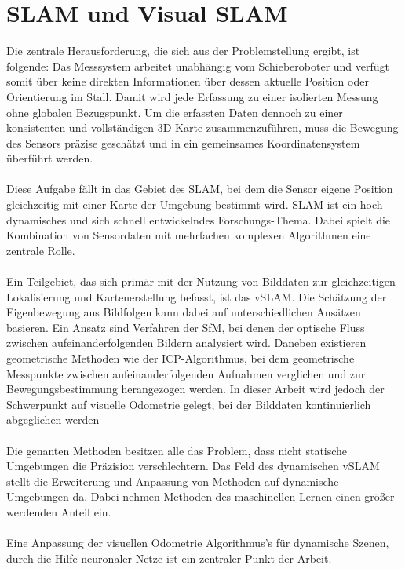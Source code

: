 \documentclass[12pt,DIV=15,BCOR=15mm,twoside,headsepline,abstract=true,listof=totoc,bibliography=totoc]{scrreprt}
\theoremstyle{remark}    %
\begin{document}
    \section{SLAM und Visual SLAM}
    Die zentrale Herausforderung, die sich aus der Problemstellung ergibt, ist folgende:
    Das Messsystem arbeitet unabhängig vom Schieberoboter und verfügt somit über keine direkten Informationen über dessen aktuelle Position oder 
    Orientierung im Stall. Damit wird jede Erfassung zu einer isolierten Messung ohne globalen Bezugspunkt.
    Um die erfassten Daten dennoch zu einer konsistenten und vollständigen 3D-Karte zusammenzuführen, muss die Bewegung des Sensors präzise geschätzt 
    und in ein gemeinsames Koordinatensystem überführt werden.\\\\
    Diese Aufgabe fällt in das Gebiet des \ac{SLAM}, bei dem die Sensor eigene Position gleichzeitig mit einer 
    Karte der Umgebung bestimmt wird. \ac{SLAM} ist ein hoch dynamisches und sich schnell entwickelndes Forschungs-Thema. Dabei spielt die Kombination 
    von Sensordaten mit mehrfachen komplexen Algorithmen eine zentrale Rolle.\\\\
    Ein Teilgebiet, das sich primär mit der Nutzung von Bilddaten zur gleichzeitigen Lokalisierung und Kartenerstellung befasst, ist das \ac{vSLAM}.
    Die Schätzung der Eigenbewegung aus Bildfolgen kann dabei auf unterschiedlichen Ansätzen basieren.
    Ein Ansatz sind Verfahren der \ac{SfM}, bei denen der optische Fluss zwischen aufeinanderfolgenden Bildern analysiert wird.
    Daneben existieren geometrische Methoden wie der \ac{ICP}-Algorithmus, bei dem geometrische Messpunkte zwischen aufeinanderfolgenden Aufnahmen verglichen 
    und zur Bewegungsbestimmung herangezogen werden.
    In dieser Arbeit wird jedoch der Schwerpunkt auf visuelle Odometrie gelegt, bei der Bilddaten kontinuierlich abgeglichen werden \cite{10577209}\\\\
    Die genanten Methoden besitzen alle das Problem, dass nicht statische Umgebungen die Präzision verschlechtern. Das Feld des dynamischen \ac{vSLAM} stellt die Erweiterung 
    und Anpassung von Methoden auf dynamische Umgebungen da. Dabei nehmen Methoden des maschinellen Lernen einen größer werdenden Anteil ein.\cite{10577209}\\\\
    Eine Anpassung der visuellen Odometrie Algorithmus's für dynamische Szenen, durch die Hilfe neuronaler Netze ist ein zentraler Punkt der Arbeit.\\\\
\end{document}
